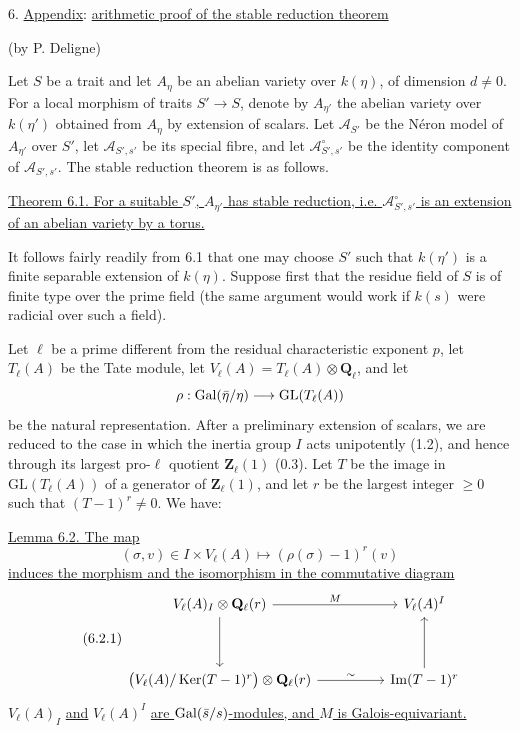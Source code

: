 6. \underline{Appendix}: \underline{arithmetic proof of the stable reduction theorem}

(by P. Deligne)

Let $S$ be a trait and let $A_\eta$ be an abelian variety over $k(\eta)$,
of dimension $d\neq 0$. For a local morphism of traits
$S'\longrightarrow S$, denote by $A_{\eta'}$ the abelian variety over
$k(\eta')$ obtained from $A_\eta$ by extension of scalars. Let
$\mathcal A_{S'}$ be the N\'eron model of $A_{\eta'}$ over $S'$, let
$\mathcal A_{S',s'}$ be its special fibre, and let
$\mathcal A^\circ_{S',s'}$ be the identity component of
$\mathcal A_{S',s'}$. The stable reduction theorem is as follows.


\underline{Theorem 6.1. For a suitable $S'$, $A_{\eta'}$ has stable
reduction, i.e. $\mathcal A^\circ_{S',s'}$ is an extension of an abelian
variety by a torus.}

It follows fairly readily from 6.1 that one may choose $S'$ such that
$k(\eta')$ is a finite separable extension of $k(\eta)$. Suppose first
that the residue field of $S$ is of finite type over the prime field (the
same argument would work if $k(s)$ were radicial over such a field).

Let $\ell$ be a prime different from the residual characteristic exponent
$p$, let $T_\ell(A)$ be the Tate module, let
$V_\ell(A)=T_\ell(A)\otimes\mathbf Q_\ell$, and let
\[
 \rho:\operatorname{Gal}(\bar\eta/\eta)\longrightarrow
 \mathrm{GL}(T_\ell(A))
\]
be the natural representation. After a preliminary extension of scalars,
we are reduced to the case in which the inertia group $I$ acts
unipotently (1.2), and hence through its largest pro-$\ell$ quotient
$\mathbf Z_\ell(1)$ (0.3). Let $T$ be the image in
$\mathrm{GL}(T_\ell(A))$ of a generator of $\mathbf Z_\ell(1)$, and let
$r$ be the largest integer $\geq 0$ such that $(T-1)^r\neq 0$. We have:

\underline{Lemma 6.2. The map}
\[
 (\sigma,v)\in I\times V_\ell(A)
 \longmapsto (\rho(\sigma)-1)^r(v)
\]
\underline{induces the morphism and the isomorphism in the commutative
diagram}
\begin{equation}\tag{6.2.1}
\begin{tikzcd}[column sep=huge, row sep=huge]
V_\ell(A)_I\otimes\mathbf Q_\ell(r)
  \arrow[r,"M"] \arrow[d]
& V_\ell(A)^I \\
\bigl(V_\ell(A)/\Ker(T-1)^r\bigr)\otimes\mathbf Q_\ell(r)
  \arrow[r,"\sim"]
& \operatorname{Im}(T-1)^r \arrow[u]
\end{tikzcd}
\end{equation}
$V_\ell(A)_I$ \underline{and} $V_\ell(A)^I$ \underline{are
$\operatorname{Gal}(\bar s/s)$-modules, and $M$ is Galois-equivariant.}

